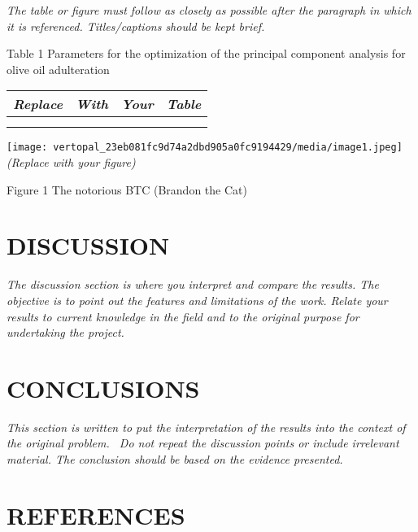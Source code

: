 \documentclass[
]{article}
\begin{document}
    \emph{The table or figure must follow as closely as possible after the
    paragraph in which it is referenced. Titles/captions should be kept
    brief.}

    \protect\hypertarget{_Toc93020061}{}{}Table 1 Parameters for the
    optimization of the principal component analysis for olive oil
    adulteration

    \begin{longtable}[]{@{}llll@{}}
        \toprule
        \emph{Replace} & \emph{With} & \emph{Your} & \emph{Table} \\
        \midrule
        \endhead
        &             &             &              \\
        &             &             &              \\
        \bottomrule
    \end{longtable}

    \texttt{[image: vertopal\_23eb081fc9d74a2dbd905a0fc9194429/media/image1.jpeg]}\emph{(Replace
    with your figure)}

    \protect\hypertarget{_Toc93020444}{}{}Figure 1 The notorious BTC
    (Brandon the Cat)

    \hypertarget{discussion}{%


        \section{DISCUSSION}\label{discussion}}

    \emph{The discussion section is where you interpret and compare the
    results. The objective is to point out the features and limitations of
    the work. Relate your results to current knowledge in the field and to
    the original purpose for undertaking the project.}

    \hypertarget{conclusions}{%


        \section{CONCLUSIONS}\label{conclusions}}

    \emph{This section is written to put the interpretation of the results
    into the context of the original problem.~ Do not repeat the discussion
    points or include irrelevant material. The conclusion should be based on
    the evidence presented.}

    \hypertarget{references}{%


        \section{REFERENCES}\label{references}}
\end{document}
